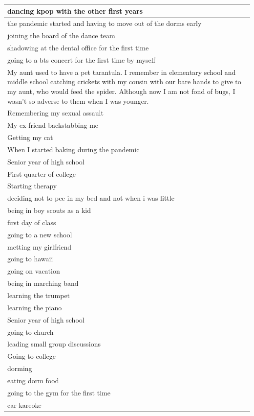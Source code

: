 \documentclass[
  .7em,
  letterpaper,
  DIV=11,
  numbers=noendperiod]{scrartcl}
\begin{document}
\begin{table}
\begin{tabular}{l}
\hline
dancing kpop with the other first years\\
\hline
the pandemic started and having to move out of the dorms early\\
\hline
joining the board of the dance team\\
\hline
shadowing at the dental office for the first time\\
\hline
going to a bts concert for the first time by myself\\
\hline
My aunt used to have a pet tarantula. I remember in elementary school and middle school catching crickets with my cousin with our bare hands to give to my aunt, who would feed the spider. Although now I am not fond of bugs, I wasn’t so adverse to them when I was younger.\\
\hline
Remembering my sexual assault\\
\hline
My ex-friend backstabbing me\\
\hline
Getting my cat\\
\hline
When I started baking during the pandemic\\
\hline
Senior year of high school\\
\hline
First quarter of college\\
\hline
Starting therapy\\
\hline
deciding not to pee in my bed and not when i was little\\
\hline
being in boy scouts as a kid\\
\hline
first day of class\\
\hline
going to a new school\\
\hline
metting my girlfriend\\
\hline
going to hawaii\\
\hline
going on vacation\\
\hline
being in marching band\\
\hline
learning the trumpet\\
\hline
learning the piano\\
\hline
Senior year of high school\\
\hline
going to church\\
\hline
leading small group discussions\\
\hline
Going to college\\
\hline
dorming\\
\hline
eating dorm food\\
\hline
going to the gym for the first time\\
\hline
car kareoke\\

\end{tabular}
\end{table}
\end{document}
